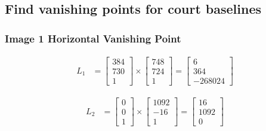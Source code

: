 \documentclass[12pt, oneside]{article}
\begin{document}
\subsection{Find vanishing points for court baselines}

\subsubsection*{Image 1 Horizontal Vanishing Point}

\begin{align*}
L_1 &=    \begin{bmatrix}
            384 \\
            730 \\
            1
        \end{bmatrix} \times 
        \begin{bmatrix}
            748 \\
            724 \\
            1
        \end{bmatrix}  = 
        \begin{bmatrix}
            6  \\
            364 \\
            -268024 
        \end{bmatrix}                                                   
\end{align*}

\begin{align*}
L_2 &=    \begin{bmatrix}
            0 \\
            0 \\
            1
        \end{bmatrix} \times 
        \begin{bmatrix}
            1092 \\
            -16 \\
            1
        \end{bmatrix}  = 
        \begin{bmatrix}
            16  \\
            1092 \\
            0 
        \end{bmatrix}                                                   
\end{align*}
\end{document}
